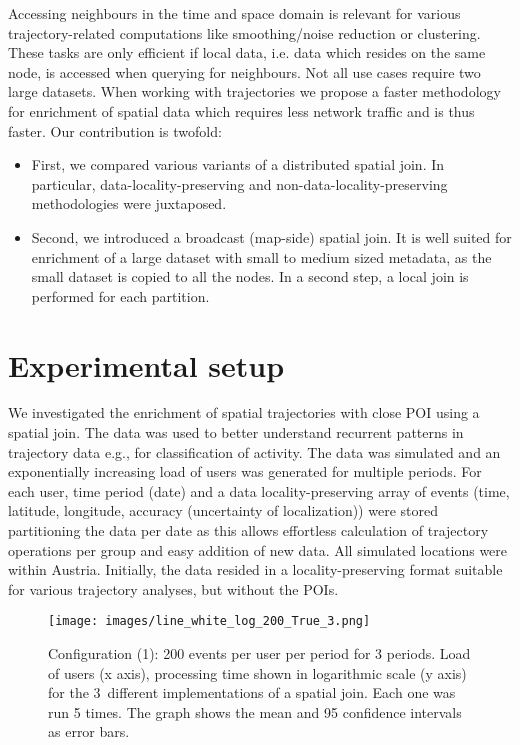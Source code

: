 \documentclass[conference]{IEEEtran}
\begin{document}
Accessing neighbours in the time and space domain is relevant for various trajectory-related 
computations like smoothing/noise reduction or clustering.
These tasks are only efficient if local data, i.e. data which resides on the same node, is accessed when querying for neighbours.
Not all use cases require two large datasets.
When working with trajectories we propose a faster methodology for enrichment of spatial data which requires less network traffic and is thus faster. Our contribution is twofold:
\begin{itemize}
  \item First, we compared various variants of a distributed spatial join. In particular, data-locality-preserving and non-data-locality-preserving methodologies were juxtaposed.
  \item Second, we introduced a broadcast (map-side) spatial join. It is well suited for enrichment of a large dataset with small to medium sized metadata, as the small dataset is copied to all the nodes. In a second step, a local join is performed for each partition.
\end{itemize}

\section{Experimental setup}
We investigated the enrichment of spatial trajectories with close POI using a spatial join.
The data was used to better understand recurrent patterns in trajectory data e.g., for classification of activity.
The data was simulated and an exponentially increasing load of users was generated for multiple periods.
For each user, time period (date) and a data locality-preserving array of events (time, 
latitude, longitude, accuracy (uncertainty of localization)) were stored partitioning the data per date as this allows effortless calculation of trajectory operations per group and easy addition of new data.
All simulated locations were within Austria.
Initially, the data resided in a locality-preserving format suitable for various trajectory analyses, but without the POIs.

\begin{figure*}
\centering\texttt{[image: images/line\_white\_log\_200\_True\_3.png]}
\centering\caption{Configuration (1): 200 events per user per period for 3 periods. Load of users (x axis), processing time shown in logarithmic scale (y axis)
for the 3~different implementations of a spatial join. Each one was run 5 times. The graph shows the mean and 95 confidence intervals as error bars.
}
\label{fig:results}
\end{figure*}
\end{document}
